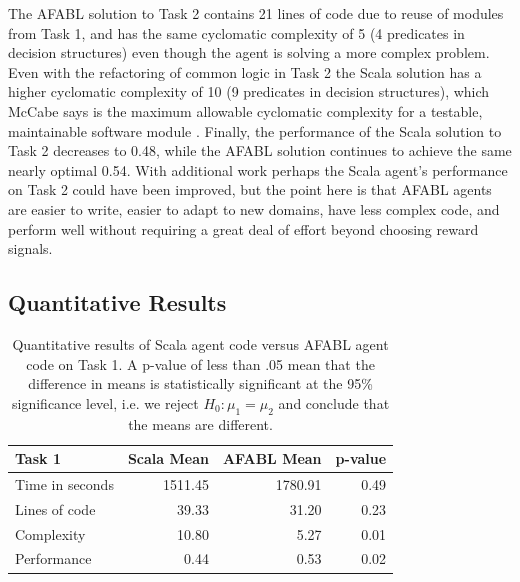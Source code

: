 The AFABL solution to Task 2 contains 21 lines of code due to reuse of modules from Task 1, and has the same cyclomatic complexity of 5 (4 predicates in decision structures) even though the agent is solving a more complex problem. Even with the refactoring of common logic in Task 2 the Scala solution has a higher cyclomatic complexity of 10 (9 predicates in decision structures), which McCabe says is the maximum allowable cyclomatic complexity for a testable, maintainable software module \cite{mccabe1976complexity}. Finally, the performance of the Scala solution to Task 2 decreases to 0.48, while the AFABL solution continues to achieve the same nearly optimal 0.54. With additional work perhaps the Scala agent's performance on Task 2 could have been improved, but the point here is that AFABL agents are easier to write, easier to adapt to new domains, have less complex code, and perform well without requiring a great deal of effort beyond choosing reward signals.

\subsection{Quantitative Results}

\begin{center}
\begin{table}[h]
\begin{center}
\begin{tabular}{|l|r|r|r|}\hline
Task 1 & Scala Mean & AFABL Mean & p-value \\\hline
Time in seconds & 1511.45 & 1780.91 & 0.49\\
Lines of code & 39.33 & 31.20 & 0.23\\
Complexity & 10.80 & 5.27 & 0.01\\
Performance & 0.44 & 0.53 & 0.02\\
\hline
\end{tabular}
\end{center}
\caption{Quantitative results of Scala agent code versus AFABL agent code on Task 1. A p-value of less than .05 mean that the difference in means is statistically significant at the 95\% significance level, i.e. we reject $H_0: \mu_1 = \mu_2$ and conclude that the means are different.}
\label{tbl:task1-results}
\end{table}
\end{center}

